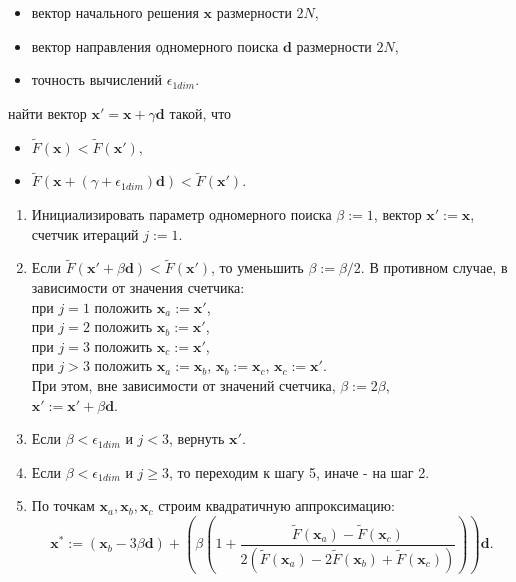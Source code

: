 \begin{itemize}
  \item вектор начального решения $\textbf{x}$ размерности $2N$,
  \item вектор направления одномерного поиска $\textbf{d}$ размерности $2N$,
  \item точность вычислений $\epsilon_{1dim}$.
\end{itemize}
 найти вектор $\textbf{x}' = \textbf{x} + \gamma \textbf{d}$ такой, что
\begin{itemize}
  \item $\tilde{F}(\textbf{x}) < \tilde{F}(\textbf{x}'),$
  \item $\tilde{F}(\textbf{x} + (\gamma + \epsilon_{1dim}) \textbf{d}) < \tilde{F}(\textbf{x}').$
\end{itemize}
\begin{enumerate}
  \item Инициализировать параметр одномерного поиска $\beta := 1$, вектор $\textbf{x}' := \textbf{x}$, счетчик итераций $j := 1$.
  \item Если $\tilde{F}(\textbf{x}' + \beta \textbf{d}) < \tilde{F}(\textbf{x}')$, то уменьшить $\beta := \beta / 2$.
  В противном случае, в зависимости от значения счетчика:\\
  при $j = 1$ положить $\textbf{x}_a := \textbf{x}'$,\\
  при $j = 2$ положить $\textbf{x}_b := \textbf{x}'$,\\
  при $j = 3$ положить $\textbf{x}_c := \textbf{x}'$,\\
  при $j > 3$ положить $\textbf{x}_a := \textbf{x}_b$, $\textbf{x}_b := \textbf{x}_c$, $\textbf{x}_c := \textbf{x}'$.\\
  При этом, вне зависимости от значений счетчика, $\beta := 2\beta$,\\
  $\textbf{x}' := \textbf{x}' + \beta \textbf{d}.$
  \item Если $\beta < \epsilon_{1dim}$ и $j < 3$, вернуть $\textbf{x}'$.
  \item Если $\beta < \epsilon_{1dim}$ и $j \geq 3$, то переходим к шагу 5, иначе - на шаг 2.
  \item По точкам $\textbf{x}_a, \textbf{x}_b, \textbf{x}_c$ строим квадратичную аппроксимацию:
   $$\textbf{x}^{*} := (\textbf{x}_b - 3 \beta \textbf{d}) +
   \left(\beta\left(1 + \frac{\tilde{F}(\textbf{x}_a) - \tilde{F}(\textbf{x}_c)}{2(\tilde{F}(\textbf{x}_a) -
   2\tilde{F}(\textbf{x}_b) + \tilde{F}(\textbf{x}_c))}\right)\right)\textbf{d}.$$\\
\end{enumerate}

